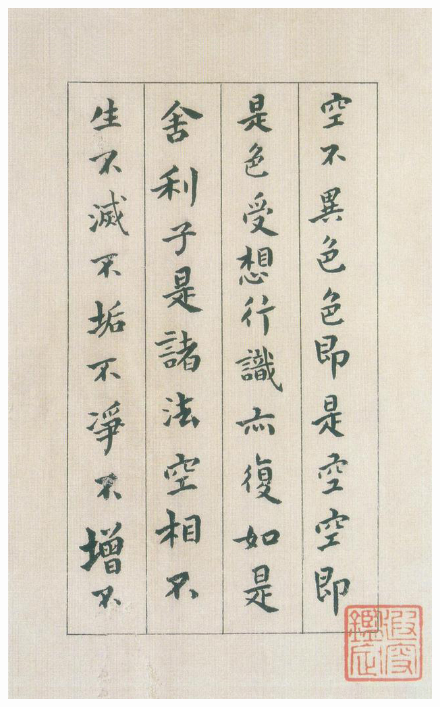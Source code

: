 \documentclass[a4paper,twoside]{article}
\begin{document}
\begin{figure}[ht]
\centering
\includegraphics[width=13.8cm]{images/fushan-2}
\end{figure}
\end{document}
